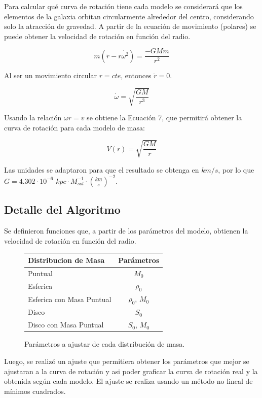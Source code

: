 \documentclass[letterpaper,oneside]{article}
\begin{document}
Para calcular qué curva de rotación tiene cada modelo se considerará que los elementos de la galaxia orbitan circularmente alrededor del centro, considerando solo la atracción de gravedad. A partir de la ecuación de movimiento (polares) se puede obtener la velocidad de rotación en función del radio.

$$ m(\ddot{r} - r\dot{\omega^{2}}) = \frac{-GMm}{r^2} $$

Al ser un movimiento circular $r=cte$, entonces $\ddot{r}=0$.

$$ \dot{\omega} = \sqrt{\frac{GM}{r^{3}}}  $$

Usando la relación $\omega r = v$ se obtiene la Ecuación 7, que permitirá obtener la curva de rotación para cada modelo de masa:

\begin{equation}
 V(r) = \sqrt{\frac{GM}{r}}   
\end{equation}

Las unidades se adaptaron para que el resultado se obtenga en $km/s$, por lo que $G = 4.302 \cdot 10^{-6}$ $kpc \cdot M_{sol}^{-1} \cdot (\frac{km}{s})^{-2}$.

\subsection{Detalle del Algoritmo}
Se definieron funciones que, a partir de los parámetros del modelo, obtienen la velocidad de rotación en función del radio.

\begin{figure}
    \begin{tabular}{| l | c |}
     \hline
    Distribucion de Masa     & Parámetros  \\ \hline
    Puntual 	              &	$M_0$	\\
    Esferica                  &	$\rho_0$	\\
    Esferica con Masa Puntual &	$\rho_0$, $M_0$	\\
    Disco       	          &	$S_0$	\\
    Disco con Masa Puntual    &	$S_0$, $M_0$	\\
    \hline
    \end{tabular}
    \caption{Parámetros a ajustar de cada distribución de masa.}
\end{figure}

Luego, se realizó un ajuste que permitiera obtener los parámetros que mejor se ajustaran a la curva de rotación y asi poder graficar la curva de rotación  real y la obtenida según cada modelo. El ajuste se realiza usando un método no lineal de mínimos cuadrados.\\
\end{document}

